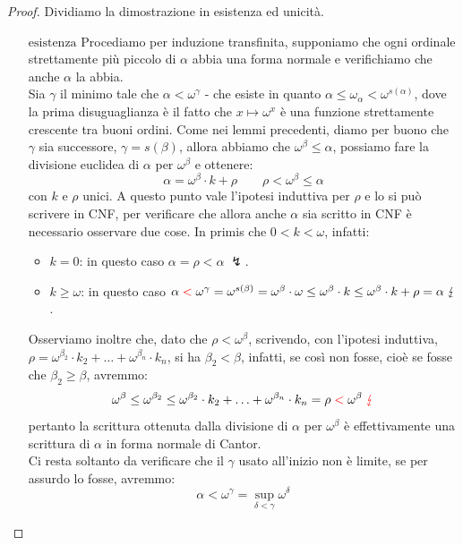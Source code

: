 \begin{proof}
	Dividiamo la dimostrazione in esistenza ed unicità.
	\begin{itemize}
		\item[$\boxed{\text{esistenza}}$] Procediamo per induzione transfinita, supponiamo che ogni ordinale strettamente più piccolo di $\alpha$ abbia una forma normale e verifichiamo che anche $\alpha$ la abbia.\\
		Sia $\gamma$ il minimo tale che $\alpha < \omega^\gamma$ - che esiste in quanto $\alpha \leq \omega_\alpha < \omega^{s(\alpha)}$, dove la prima disuguaglianza è il fatto che $x \mapsto \omega^x$ è una funzione strettamente crescente tra buoni ordini.
		Come nei lemmi precedenti, diamo per buono che $\gamma$ sia successore, $\gamma = s(\beta)$, allora abbiamo che $\omega^\beta \leq \alpha$, possiamo fare la divisione euclidea di $\alpha$ per $\omega^\beta$ e ottenere:
		\[ \alpha = \omega^\beta \cdot k + \rho \qquad \rho < \omega^\beta \leq \alpha
			\]
		con $k$ e $\rho$ unici. A questo punto vale l'ipotesi induttiva per $\rho$ e lo si può scrivere in CNF, per verificare che allora anche $\alpha$ sia scritto in CNF è necessario osservare due cose. In primis che $0 < k < \omega$, infatti:
		\begin{itemize}
			\item \textbf{\underline{$k = 0$}}: in questo caso $\alpha = \rho < \alpha \; \lightning$.
			\item \textbf{\underline{$k \geq \omega$}}: in questo caso $\alpha \;\textcolor{red}<\;\omega^\gamma = \omega^{s(\beta)} = \omega^\beta \cdot \omega \leq \omega^\beta \cdot k \leq \omega^\beta \cdot k + \rho = \alpha \; \lightning$.
		\end{itemize}
		Osserviamo inoltre che, dato che $\rho < \omega^\beta$, scrivendo, con l'ipotesi induttiva, $\rho = \omega^{\beta_2} \cdot k_2 + \ldots + \omega^{\beta_n} \cdot k_n$, si ha $\beta_2 < \beta$, infatti, se così non fosse, cioè se fosse che $\beta_2 \geq \beta$, avremmo:
		\[ \omega^\beta \leq \omega^{\beta_2} \leq \omega^{\beta_2} \cdot k_2 + \ldots + \omega^{\beta_n} \cdot k_n = \rho \;\textcolor{red}<\; \omega^\beta \; \textcolor{red}\lightning
			\]
		pertanto la scrittura ottenuta dalla divisione di $\alpha$ per $\omega^\beta$ è effettivamente una scrittura di $\alpha$ in forma normale di Cantor.\\
		Ci resta soltanto da verificare che il $\gamma$ usato all'inizio non è limite, se per assurdo lo fosse, avremmo:
		\[ \alpha < \omega^\gamma = \sup_{\delta < \gamma} \omega^\delta
\]
\end{itemize}
\end{proof}
